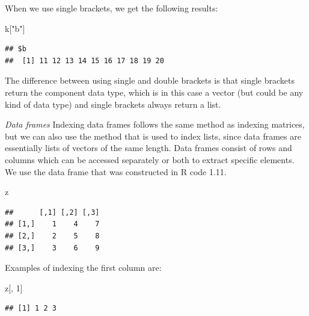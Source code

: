 \documentclass[]{book}
\newenvironment{Shaded}{\begin{snugshade}}{\end{snugshade}}
\newcommand{\DecValTok}[1]{\textcolor[rgb]{0.00,0.00,0.81}{#1}}
\newcommand{\StringTok}[1]{\textcolor[rgb]{0.31,0.60,0.02}{#1}}
\newcommand{\OperatorTok}[1]{\textcolor[rgb]{0.81,0.36,0.00}{\textbf{#1}}}
\newcommand{\NormalTok}[1]{#1}
\theoremstyle{definition}
\theoremstyle{definition}
\theoremstyle{definition}
\theoremstyle{remark}
\begin{document}
When we use single brackets, we get the following results:

\begin{Shaded}
\begin{Highlighting}[]
\NormalTok{k[}\StringTok{"b"}\NormalTok{]}
\end{Highlighting}
\end{Shaded}

\begin{verbatim}
## $b
##  [1] 11 12 13 14 15 16 17 18 19 20
\end{verbatim}

The difference between using single and double brackets is that single
brackets return the component data type, which is in this case a vector
(but could be any kind of data type) and single brackets always return a
list.

\emph{Data frames} Indexing data frames follows the same method as
indexing matrices, but we can also use the method that is used to index
lists, since data frames are essentially lists of vectors of the same
length. Data frames consist of rows and columns which can be accessed
separately or both to extract specific elements. We use the data frame
that was constructed in R code 1.11.

\begin{Shaded}
\begin{Highlighting}[]
\NormalTok{z}
\end{Highlighting}
\end{Shaded}

\begin{verbatim}
##      [,1] [,2] [,3]
## [1,]    1    4    7
## [2,]    2    5    8
## [3,]    3    6    9
\end{verbatim}

Examples of indexing the first column are:

\begin{Shaded}
\begin{Highlighting}[]
\NormalTok{z[, }\DecValTok{1}\NormalTok{]}
\end{Highlighting}
\end{Shaded}

\begin{verbatim}
## [1] 1 2 3
\end{verbatim}

\begin{Shaded}
\end{Shaded}
\end{document}
